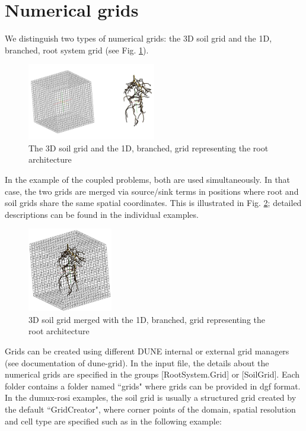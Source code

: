 \chapter*{Numerical grids}
We distinguish two types of numerical grids: the 3D soil grid and the 1D, branched, root system grid (see Fig. \ref{fig:grids}). 

\begin{figure}[ht]
	\centering
  \includegraphics[width=0.5\textwidth]{grids.jpg}
	\caption{The 3D soil grid and the 1D, branched, grid representing the root architecture}
	\label{fig:grids}
\end{figure}

In the example of the coupled problems, both are used simultaneously. In that case, the two grids are merged via source/sink terms in positions where root and soil grids share the same spatial coordinates. This is illustrated in Fig. \ref{fig:merged}; detailed descriptions can be found in the individual examples. 
 
\begin{figure}[ht]
	\centering
  \includegraphics[width=0.33\textwidth]{merged.jpg}
	\caption{3D soil grid merged with the 1D, branched, grid representing the root architecture}
	\label{fig:merged}
\end{figure}

Grids can be created using different DUNE internal or external grid managers (see documentation of dune-grid). In the input file, the details about the numerical grids are specified in the groups [RootSystem.Grid] or [SoilGrid]. Each folder contains a folder named ``grids" where grids can be provided in dgf format. In the dumux-rosi examples, the soil grid is usually a structured grid created by the default ``GridCreator", where corner points of the domain, spatial resolution and cell type are specified such as in the following example: 

